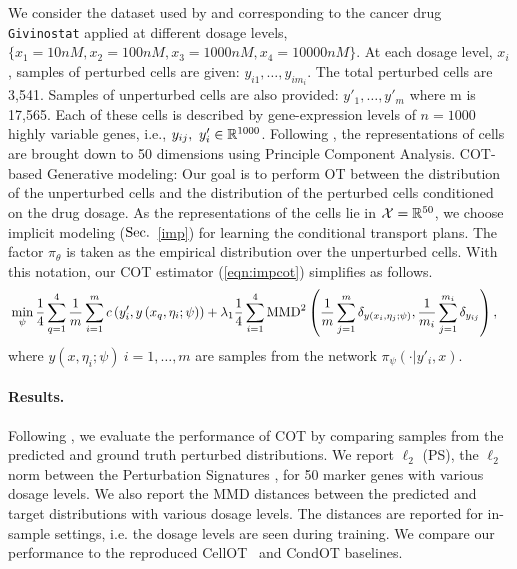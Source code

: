 We consider the dataset used by \cite{Cuturi22} and \cite{cellot} corresponding to the cancer drug \texttt{Givinostat} applied at different dosage levels, $\{x_1=10nM, x_2=100nM, x_3=1000nM, x_4=10000nM\}$. At each dosage level, $x_i$, samples of perturbed cells are given: $y_{i1},\ldots,y_{im_i}$. The total perturbed cells are 3,541. Samples of unperturbed cells are also provided: $y'_1,\ldots,y'_m$ where m is 17,565. Each of these cells is described by gene-expression levels of $n=1000$ highly variable genes, i.e., $y_{ij},\ y'_i\in\R^{1000}$. Following \cite{Cuturi22}, the representations of cells are brought down to 50 dimensions using Principle Component Analysis.
\newline
COT-based Generative modeling: Our goal is to perform OT between the distribution of the unperturbed cells and the distribution of the perturbed cells conditioned on the drug dosage. As the representations of the cells lie in $\calX=\R^{50}$, we choose implicit modeling ($\S$~\ref{imp}) for learning the conditional transport plans. The factor $\pi_\theta$ is taken as the empirical distribution over the unperturbed cells. With this notation, our COT estimator (\ref{eqn:impcot}) simplifies as follows.
\begin{align*}
&\min\limits_{\psi}\frac{1}{4}\sum_{q=1}^4\frac{1}{m}\sum_{i=1}^{m} c\left(y'_{i}, y\left(x_q,\eta_{i};\psi\right)\right)+\lambda_1\frac{1}{4}\sum_{i=1}^4\MMD^2\left(\frac{1}{m}\sum_{j=1}^{m}\delta_{y\left(x_i, \eta_{j};\psi\right) }, \frac{1}{m_i}\sum_{j=1}^{m_i}\delta_{y_{ij}}\right),
\end{align*}
where $y\left(x, \eta_{i};\psi\right)\ i=1,\ldots,m$ are samples from the network $\pi_\psi(\cdot|y'_{i},x)$.

\paragraph{Results.} 

Following \cite{Cuturi22}, we evaluate the performance of COT by comparing samples from the predicted and ground truth perturbed distributions. We report $\ell_2$ (PS), the $\ell_2$ norm between the Perturbation Signatures \citep{Stathias2018DrugAD}, for 50 marker genes with various dosage levels. We also report the MMD distances between the predicted and target distributions with various dosage levels. The distances are reported for in-sample settings, i.e. the dosage levels are seen during training. We compare our performance to the reproduced CellOT~\citep{cellot} and CondOT \citep{Cuturi22} baselines.

